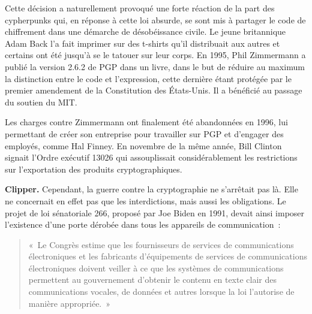 Cette décision a naturellement provoqué une forte réaction de la part des cypherpunks qui, en réponse à cette loi absurde, se sont mis à partager le code de chiffrement dans une démarche de désobéissance civile. Le jeune britannique Adam Back l'a fait imprimer sur des t-shirts qu'il distribuait aux autres et certains ont été jusqu'à se le tatouer sur leur corps. En 1995, Phil Zimmermann a publié la version 2.6.2 de PGP dans un livre, dans le but de réduire au maximum la distinction entre le code et l'expression, cette dernière étant protégée par le premier amendement de la Constitution des États-Unis. Il a bénéficié au passage du soutien du MIT.

Les charges contre Zimmermann ont finalement été abandonnées en 1996, lui permettant de créer son entreprise pour travailler sur PGP et d'engager des employés, comme Hal Finney. En novembre de la même année, Bill Clinton signait l'Ordre exécutif 13026 qui assouplissait considérablement les restrictions sur l'exportation des produits cryptographiques.

\textbf{Clipper.} Cependant, la guerre contre la cryptographie ne s'arrêtait pas là. Elle ne concernait en effet pas que les interdictions, mais aussi les obligations. Le projet de loi sénatoriale 266, proposé par Joe Biden en 1991, devait ainsi imposer l'existence d'une porte dérobée dans tous les appareils de communication~: %

\begin{quote}
«~Le Congrès estime que les fournisseurs de services de communications électroniques et les fabricants d'équipements de services de communications électroniques doivent veiller à ce que les systèmes de communications permettent au gouvernement d'obtenir le contenu en texte clair des communications vocales, de données et autres lorsque la loi l'autorise de manière appropriée.~»
\end{quote} %

